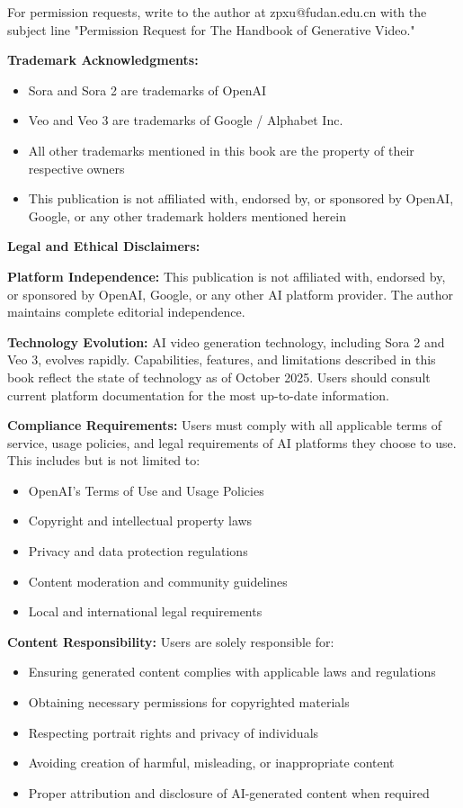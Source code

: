 \documentclass[11pt,a4paper,openright]{book}
\begin{document}
For permission requests, write to the author at zpxu@fudan.edu.cn with the subject line "Permission Request for The Handbook of Generative Video."

\textbf{Trademark Acknowledgments:}
\begin{itemize}
\item Sora and Sora 2 are trademarks of OpenAI
\item Veo and Veo 3 are trademarks of Google / Alphabet Inc.
\item All other trademarks mentioned in this book are the property of their respective owners
\item This publication is not affiliated with, endorsed by, or sponsored by OpenAI, Google, or any other trademark holders mentioned herein
\end{itemize}

\vspace{0.5cm}

\textbf{Legal and Ethical Disclaimers:}

\textbf{Platform Independence:} This publication is not affiliated with, endorsed by, or sponsored by OpenAI, Google, or any other AI platform provider. The author maintains complete editorial independence.

\textbf{Technology Evolution:} AI video generation technology, including Sora 2 and Veo 3, evolves rapidly. Capabilities, features, and limitations described in this book reflect the state of technology as of October 2025. Users should consult current platform documentation for the most up-to-date information.

\textbf{Compliance Requirements:} Users must comply with all applicable terms of service, usage policies, and legal requirements of AI platforms they choose to use. This includes but is not limited to:
\begin{itemize}
\item OpenAI's Terms of Use and Usage Policies
\item Copyright and intellectual property laws
\item Privacy and data protection regulations
\item Content moderation and community guidelines
\item Local and international legal requirements
\end{itemize}

\textbf{Content Responsibility:} Users are solely responsible for:
\begin{itemize}
\item Ensuring generated content complies with applicable laws and regulations
\item Obtaining necessary permissions for copyrighted materials
\item Respecting portrait rights and privacy of individuals
\item Avoiding creation of harmful, misleading, or inappropriate content
\item Proper attribution and disclosure of AI-generated content when required
\end{itemize}
\end{document}
